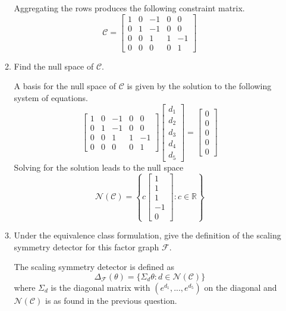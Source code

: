 \begin{enumerate}
\begin{enumerate}
\begin{solution}
Aggregating the rows produces the following constraint matrix.
\[
\mathcal{C} =
\begin{bmatrix}
1 & 0 & -1 & 0 & 0 \\
0 & 1 & -1 & 0 & 0 \\
0 & 0 & 1 & 1 & -1 \\
0 & 0 & 0 & 0 & 1
\end{bmatrix}
\]
\end{solution}

\item
Find the null space of $\mathcal{C}$.

\begin{solution}
A basis for the null space of $\mathcal{C}$ is given by the solution to the following system of equations.
\[
\begin{bmatrix}
1 & 0 & -1 & 0 & 0 \\
0 & 1 & -1 & 0 & 0 \\
0 & 0 & 1 & 1 & -1 \\
0 & 0 & 0 & 0 & 1
\end{bmatrix}
\begin{bmatrix}
d_1 \\ d_2 \\ d_3 \\ d_4 \\ d_5
\end{bmatrix}
=
\begin{bmatrix}
0 \\ 0 \\ 0 \\ 0 \\ 0
\end{bmatrix}
\]
Solving for the solution leads to the null space
\[
\mathcal{N}(\mathcal{C}) = \left\{c
\begin{bmatrix}
1 \\ 1 \\ 1 \\ -1 \\ 0
\end{bmatrix}
: c\in\mathbb{R}
\right\}
\]
\end{solution}

\item
Under the equivalence class formulation, give the definition of the scaling symmetry detector for this factor graph $\mathcal{F}$.

\begin{solution}
The scaling symmetry detector is defined as
\[
\Delta_\mathcal{F}(\theta) = \{\Sigma_d\theta:d\in\mathcal{N}(\mathcal{C})\}
\]
where $\Sigma_d$ is the diagonal matrix with $(e^{d_1},...,e^{d_5})$ on the diagonal and $\mathcal{N}(\mathcal{C})$ is as found in the previous question. 
\end{solution}


\end{enumerate}
\end{enumerate}
